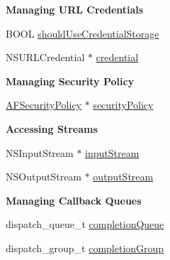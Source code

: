 \begin{Indent}\textbf{ Managing U\+RL Credentials}\par
{\em 

 

 }\begin{DoxyCompactItemize}
\item 
B\+O\+OL \mbox{\hyperlink{interface_a_f_u_r_l_connection_operation_a48bd01b0c9afd1f5234d01d28e3764e7}{should\+Use\+Credential\+Storage}}
\item 
N\+S\+U\+R\+L\+Credential $\ast$ \mbox{\hyperlink{interface_a_f_u_r_l_connection_operation_a1d39a602a705ae03cd1b4b7097a47524}{credential}}
\end{DoxyCompactItemize}
\end{Indent}
\begin{Indent}\textbf{ Managing Security Policy}\par
{\em 

 

 }\begin{DoxyCompactItemize}
\item 
\mbox{\hyperlink{interface_a_f_security_policy}{A\+F\+Security\+Policy}} $\ast$ \mbox{\hyperlink{interface_a_f_u_r_l_connection_operation_a7e4a0c5b72bfc1d6d7058295264117ae}{security\+Policy}}
\end{DoxyCompactItemize}
\end{Indent}
\begin{Indent}\textbf{ Accessing Streams}\par
{\em 

 

 }\begin{DoxyCompactItemize}
\item 
N\+S\+Input\+Stream $\ast$ \mbox{\hyperlink{interface_a_f_u_r_l_connection_operation_a2a8f5ad38fa0f464f0104f9e46cf4043}{input\+Stream}}
\item 
N\+S\+Output\+Stream $\ast$ \mbox{\hyperlink{interface_a_f_u_r_l_connection_operation_a6778c4ebc8739292f8aa0ebdffba0749}{output\+Stream}}
\end{DoxyCompactItemize}
\end{Indent}
\begin{Indent}\textbf{ Managing Callback Queues}\par
{\em 

 

 }\begin{DoxyCompactItemize}
\item 
dispatch\+\_\+queue\+\_\+t \mbox{\hyperlink{interface_a_f_u_r_l_connection_operation_a18619e16ca125bb52c17c3ec80acccfb}{completion\+Queue}}
\item 
dispatch\+\_\+group\+\_\+t \mbox{\hyperlink{interface_a_f_u_r_l_connection_operation_aa4955286ccd61583815487d48e87dbdc}{completion\+Group}}
\end{DoxyCompactItemize}
\end{Indent}
